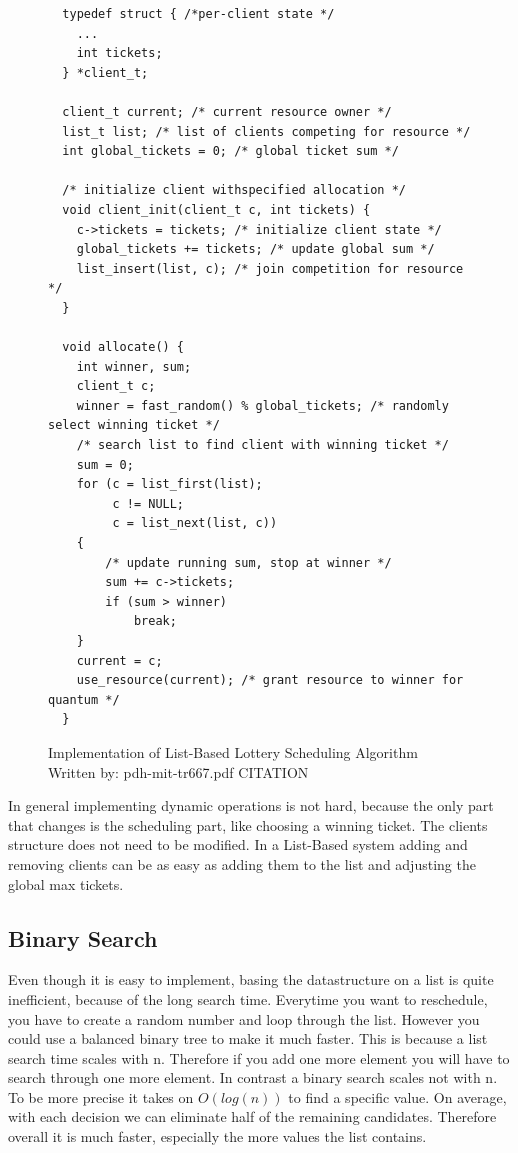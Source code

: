 \begin{figure}[H]
    \begin{verbatim}
  typedef struct { /*per-client state */
    ...
    int tickets;
  } *client_t;

  client_t current; /* current resource owner */
  list_t list; /* list of clients competing for resource */
  int global_tickets = 0; /* global ticket sum */

  /* initialize client withspecified allocation */
  void client_init(client_t c, int tickets) {
    c->tickets = tickets; /* initialize client state */ 
    global_tickets += tickets; /* update global sum */
    list_insert(list, c); /* join competition for resource */
  }

  void allocate() {
    int winner, sum;
    client_t c;
    winner = fast_random() % global_tickets; /* randomly select winning ticket */
    /* search list to find client with winning ticket */
    sum = 0;
    for (c = list_first(list);
         c != NULL;
         c = list_next(list, c))
    {
        /* update running sum, stop at winner */
        sum += c->tickets;
        if (sum > winner)
            break;
    }
    current = c;
    use_resource(current); /* grant resource to winner for quantum */
  }
    \end{verbatim}
    \caption{Implementation of List-Based Lottery Scheduling Algorithm\\Written by: pdh-mit-tr667.pdf CITATION}
    \label{code:lottery-sched}
\end{figure}

In general implementing dynamic operations is not hard, because the only part that changes is the scheduling part, like choosing a winning ticket.
The clients structure does not need to be modified.
In a List-Based system adding and removing clients can be as easy as adding them to the list and adjusting the global max tickets.


\subsection{Binary Search}

Even though it is easy to implement, basing the datastructure on a list is quite inefficient, because of the long search time.
Everytime you want to reschedule, you have to create a random number and loop through the list.
However you could use a balanced binary tree to make it much faster.
This is because a list search time scales with n. 
Therefore if you add one more element you will have to search through one more element.
In contrast a binary search scales not with n.
To be more precise it takes on $O(log(n))$ to find a specific value.
On average, with each decision we can eliminate half of the remaining candidates.
Therefore overall it is much faster, especially the more values the list contains.

